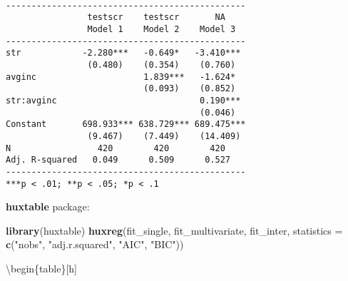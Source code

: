 \documentclass[12pt,]{article}
\newenvironment{Shaded}{\begin{snugshade}}{\end{snugshade}}
\newcommand{\DataTypeTok}[1]{\textcolor[rgb]{0.13,0.29,0.53}{#1}}
\newcommand{\KeywordTok}[1]{\textcolor[rgb]{0.13,0.29,0.53}{\textbf{#1}}}
\newcommand{\NormalTok}[1]{#1}
\newcommand{\StringTok}[1]{\textcolor[rgb]{0.31,0.60,0.02}{#1}}
\begin{document}
\begin{verbatim}

-----------------------------------------------
                testscr    testscr       NA    
                Model 1    Model 2    Model 3  
-----------------------------------------------
str            -2.280***   -0.649*   -3.410*** 
                (0.480)    (0.354)    (0.760)  
avginc                     1.839***   -1.624*  
                           (0.093)    (0.852)  
str:avginc                            0.190*** 
                                      (0.046)  
Constant       698.933*** 638.729*** 689.475***
                (9.467)    (7.449)    (14.409) 
N                 420        420        420    
Adj. R-squared   0.049      0.509      0.527   
-----------------------------------------------
***p < .01; **p < .05; *p < .1                 
\end{verbatim}

\textbf{huxtable} package:

\begin{Shaded}
\begin{Highlighting}[]
\KeywordTok{library}\NormalTok{(huxtable)}
\KeywordTok{huxreg}\NormalTok{(fit_single, }
\NormalTok{fit_multivariate, }
\NormalTok{fit_inter, }
\DataTypeTok{statistics =} \KeywordTok{c}\NormalTok{(}\StringTok{"nobs"}\NormalTok{, }\StringTok{"adj.r.squared"}\NormalTok{, }\StringTok{"AIC"}\NormalTok{, }\StringTok{"BIC"}\NormalTok{)) }
\end{Highlighting}
\end{Shaded}

\textbackslash{}begin\{table\}{[}h{]} \centering
\end{document}
